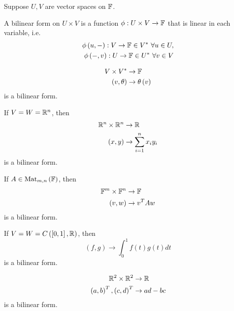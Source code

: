 \documentclass[a4paper]{article}
\begin{document}
Suppose $U,V$ are vector spaces on $\mathbb{F}$.

\begin{defi}
A bilinear form on $U\times V$ is a function $\phi: U \times V \to \mathbb{F}$ that is linear in each variable, i.e.
\begin{equation*}
\begin{aligned}
\phi\left(u,-\right):V \to \mathbb{F} \in V^* \ \forall u \in U,\\
\phi\left(-,v\right):U \to \mathbb{F} \in U^* \ \forall v \in V
\end{aligned}
\end{equation*}
\end{defi}

\begin{eg}
\begin{equation*}
\begin{aligned}
V \times V^* &\to \mathbb{F}\\
\left(v,\theta\right) &\to \theta\left(v\right)
\end{aligned}
\end{equation*}
is a bilinear form.
\end{eg}

\begin{eg}
If $V=W=\mathbb{R}^n$, then
\begin{equation*}
\begin{aligned}
\mathbb{R}^n \times \mathbb{R}^n &\to \mathbb{R}\\
\left(x,y\right) &\to \sum_{i=1}^n x_i y_i
\end{aligned}
\end{equation*}
is a bilinear form.
\end{eg}

\begin{eg}
If $A \in \operatorname{Mat}_{m,n}\left(\mathbb{F}\right)$, then
\begin{equation*}
\begin{aligned}
\mathbb{F}^m \times \mathbb{F}^n &\to \mathbb{F}\\
\left(v,w\right) &\to v^T A w
\end{aligned}
\end{equation*}
is a bilinear form.
\end{eg}

\begin{eg}
If $V=W=C\left(\left[0,1\right],\mathbb{R}\right)$, then $$\left(f,g\right) \to \int_0^1 f\left(t\right)g\left(t\right) dt$$ is a bilinear form.
\end{eg}

\begin{eg}
\begin{equation*}
\begin{aligned}
\mathbb{R}^2 \times \mathbb{R}^2 &\to \mathbb{R}\\
\left(a,b\right)^T, \left(c,d\right)^T &\to ad-bc
\end{aligned}
\end{equation*}
is a bilinear form.
\end{eg}
\end{document}
